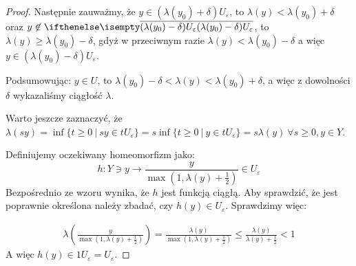\begin{lem}
\begin{proof}
    Następnie zauważmy, że $y \in (\lambda(y_0) + \delta) U_\varepsilon$, to $\lambda(y) < \lambda(y_0) + \delta$ oraz $y \not\in \cl{(\lambda(y_0) - \delta) U_\varepsilon}$, to $\lambda(y) \geq \lambda(y_0) - \delta$, gdyż w przeciwnym razie $\lambda(y) < \lambda(y_0) - \delta$ a więc $y \in (\lambda(y_0) - \delta) U_\varepsilon$.
    
    Podsumowując: $y \in U$, to $\lambda(y_0) - \delta < \lambda(y) < \lambda(y_0) + \delta$, a więc z dowolności $\delta$ wykazaliśmy ciągłość $\lambda$.
    
    Warto jeszcze zaznaczyć, że $\lambda(sy) = \inf \{t \geq 0\ |\ sy \in t U_\varepsilon\} = s\inf \{t \geq 0\ |\ y \in t U_\varepsilon\} = s \lambda(y)\ \forall s \geq 0, y \in Y$.
    
    Definiujemy oczekiwany homeomorfizm jako:
    \[
      h: Y \ni y \to \frac{y}{\max\left(1, \lambda(y) + \frac{1}{2}\right)} \in U_\varepsilon
    \]
    Bezpośrednio ze wzoru wynika, że $h$ jest funkcją ciągłą. Aby sprawdzić, że jest poprawnie określona należy zbadać, czy $h(y) \in U_\varepsilon$. Sprawdzimy więc:
    
    \begin{align*}
      \lambda\left(\frac{y}{\max\left(1, \lambda(y) + \frac{1}{2}\right)}\right) =
      \frac{\lambda(y)}{\max\left(1, \lambda(y) + \frac{1}{2}\right)} \leq
      \frac{\lambda(y)}{\lambda(y) + \frac{1}{2}} < 1
    \end{align*}
    A więc $h(y) \in 1 U_\varepsilon = U_\varepsilon$.
    

\end{proof}
\end{lem}
